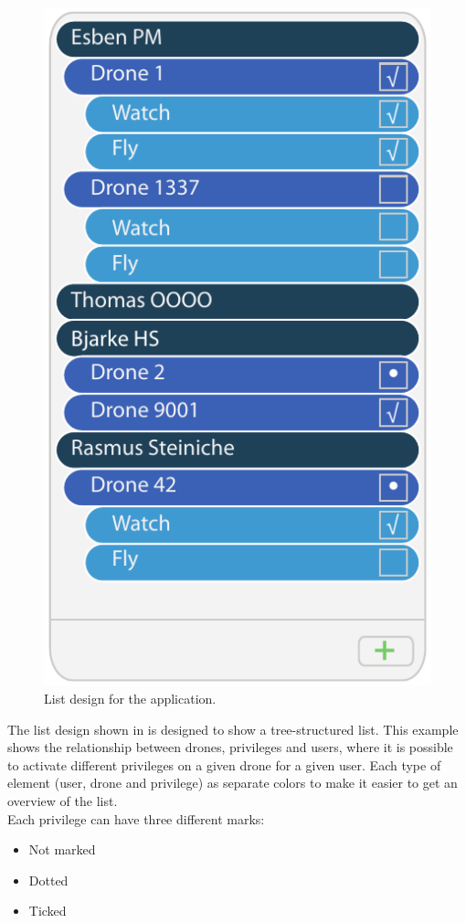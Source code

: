 \begin{figure}[htb]
    \centering
    \includegraphics[scale=1.0]{gfx/list.pdf}
    \caption{List design for the application.}
    \label{fig:list_design}
\end{figure}
The list design shown in  is designed to show a tree-structured list. 
This example shows the relationship between drones, privileges and users, where it is possible to activate different privileges on a given drone for a given user. 
Each type of element (user, drone and privilege) as separate colors to make it easier to get an overview of the list. \\

Each privilege can have three different marks:

\begin{itemize}
	\item Not marked
	\item Dotted
	\item Ticked
\end{itemize}

